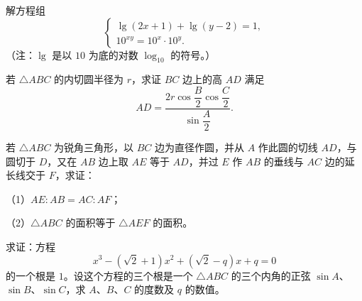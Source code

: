 \begin{question}
解方程组
\nopagebreak[4]
\[
\begin{cases}
\lg(2x+1)+\lg(y-2)=1,\\
10^{xy}=10^x\cdot10^y.
\end{cases}
\]
（注：$\lg$ 是以 $10$ 为底的对数 $\log_{10}$ 的符号。）

\end{question}
\begin{question}
若 $\triangle ABC$ 的内切圆半径为 $r$，求证 $BC$ 边上的高 $AD$ 满足
\nopagebreak[4]
\[
AD=\frac{2r\cos\dfrac B2\cos\dfrac C2}{\sin\dfrac A2}.
\]

\end{question}
\begin{question}
若 $\triangle ABC$ 为锐角三角形，以 $BC$ 边为直径作圆，并从 $A$ 作此圆的切线 $AD$，与圆切于 $D$，又在 $AB$ 边上取 $AE$ 等于 $AD$，并过 $E$ 作 $AB$ 的垂线与 $AC$ 边的延长线交于 $F$，求证：

（1）$AE:AB=AC:AF$；

（2）$\triangle ABC$ 的面积等于 $\triangle AEF$ 的面积。

\end{question}
\begin{question}
求证：方程
\nopagebreak[4]
\[
x^3-(\sqrt2+1)x^2+(\sqrt2-q)x+q=0
\]
的一个根是 $1$。设这个方程的三个根是一个 $\triangle ABC$ 的三个内角的正弦 $\sin A$、$\sin B$、$\sin C$，求 $A$、$B$、$C$ 的度数及 $q$ 的数值。

\end{question}